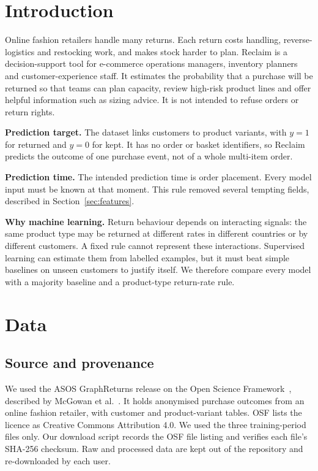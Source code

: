 \documentclass[11pt,a4paper]{article}
\begin{document}
\newpage
\section{Introduction}
Online fashion retailers handle many returns. Each return costs handling, reverse-logistics and restocking work, and makes stock harder to plan. Reclaim is a decision-support tool for e-commerce operations managers, inventory planners and customer-experience staff. It estimates the probability that a purchase will be returned so that teams can plan capacity, review high-risk product lines and offer helpful information such as sizing advice. It is not intended to refuse orders or return rights.

\textbf{Prediction target.} The dataset links customers to product variants, with \(y=1\) for returned and \(y=0\) for kept. It has no order or basket identifiers, so Reclaim predicts the outcome of one purchase event, not of a whole multi-item order.

\textbf{Prediction time.} The intended prediction time is order placement. Every model input must be known at that moment. This rule removed several tempting fields, described in Section~\ref{sec:features}.

\textbf{Why machine learning.} Return behaviour depends on interacting signals: the same product type may be returned at different rates in different countries or by different customers. A fixed rule cannot represent these interactions. Supervised learning can estimate them from labelled examples, but it must beat simple baselines on unseen customers to justify itself. We therefore compare every model with a majority baseline and a product-type return-rate rule.

\section{Data}
\subsection{Source and provenance}
We used the ASOS GraphReturns release on the Open Science Framework~\cite{data}, described by McGowan et al.~\cite{paper}. It holds anonymised purchase outcomes from an online fashion retailer, with customer and product-variant tables. OSF lists the licence as Creative Commons Attribution 4.0. We used the three training-period files only. Our download script records the OSF file listing and verifies each file's SHA-256 checksum. Raw and processed data are kept out of the repository and re-downloaded by each user.
\end{document}
